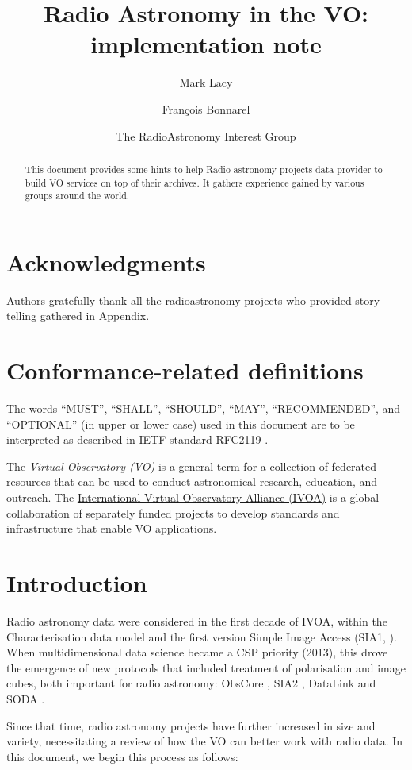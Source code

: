 \documentclass[11pt,a4paper]{ivoa}
\title{Radio Astronomy in the VO:\\ implementation note}
\author[https://wiki.ivoa.net/twiki/bin/view/IVOA/MarkLacy]{Mark Lacy}
\author[https://wiki.ivoa.net/twiki/bin/view/IVOA/FrancoisBonnarel]{Fran\c cois Bonnarel}
\author{The RadioAstronomy Interest Group}
\begin{document}
\begin{abstract}
	This document provides some hints to help Radio astronomy projects data provider to build VO
	services on top of their archives. It gathers experience gained by various groups around the world.
\end{abstract}


\section*{Acknowledgments}

Authors gratefully thank all the radioastronomy projects who provided story-telling gathered in 
Appendix.

\section*{Conformance-related definitions}

The words ``MUST'', ``SHALL'', ``SHOULD'', ``MAY'', ``RECOMMENDED'', and
``OPTIONAL'' (in upper or lower case) used in this document are to be
interpreted as described in IETF standard RFC2119 \citep{std:RFC2119}.

The \emph{Virtual Observatory (VO)} is a
general term for a collection of federated resources that can be used
to conduct astronomical research, education, and outreach.
The \href{https://www.ivoa.net}{International
Virtual Observatory Alliance (IVOA)} is a global
collaboration of separately funded projects to develop standards and
infrastructure that enable VO applications.


\section{Introduction}

Radio astronomy data were considered in the first decade of IVOA, within the Characterisation data 
model \citep{2008ivoa.spec.0325L} and the first version Simple Image Access (SIA1, \cite{std:SIAP}). 
When multidimensional data science became a CSP priority (2013), this drove the emergence of new 
protocols that included treatment of polarisation and image cubes, both important for radio 
astronomy: ObsCore \citep{std:OBSCORE}, SIA2 \citep{std:SIAV2} , DataLink \citep{2015ivoa.spec.0617D} 
and SODA \citep{std:SODA}. 

Since that time, radio astronomy projects have further increased in size and variety, necessitating 
a review of how the VO can better work with radio data. In this document, we begin this process as 
follows:
\end{document}

